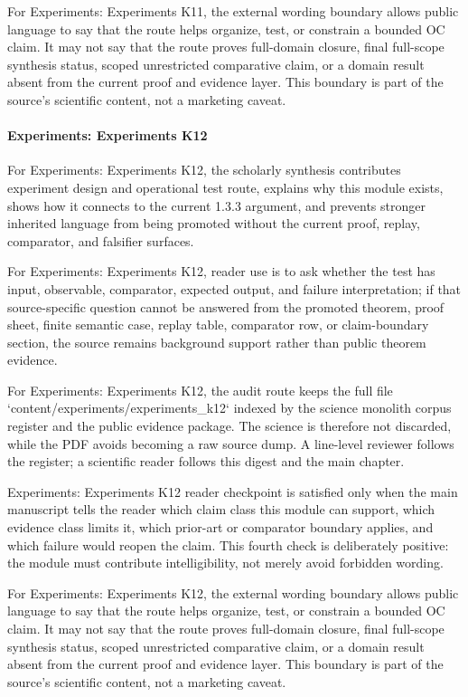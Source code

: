 For Experiments: Experiments K11, the external wording boundary allows public language to say that the route helps organize, test, or constrain a bounded OC claim. It may not say that the route proves full-domain closure, final full-scope synthesis status, scoped unrestricted comparative claim, or a domain result absent from the current proof and evidence layer. This boundary is part of the source's scientific content, not a marketing caveat.


\paragraph{Experiments: Experiments K12}

For Experiments: Experiments K12, the scholarly synthesis contributes experiment design and operational test route, explains why this module exists, shows how it connects to the current 1.3.3 argument, and prevents stronger inherited language from being promoted without the current proof, replay, comparator, and falsifier surfaces.


For Experiments: Experiments K12, reader use is to ask whether the test has input, observable, comparator, expected output, and failure interpretation; if that source-specific question cannot be answered from the promoted theorem, proof sheet, finite semantic case, replay table, comparator row, or claim-boundary section, the source remains background support rather than public theorem evidence.


For Experiments: Experiments K12, the audit route keeps the full file `content/experiments/experiments\_k12` indexed by the science monolith corpus register and the public evidence package. The science is therefore not discarded, while the PDF avoids becoming a raw source dump. A line-level reviewer follows the register; a scientific reader follows this digest and the main chapter.


Experiments: Experiments K12 reader checkpoint is satisfied only when the main manuscript tells the reader which claim class this module can support, which evidence class limits it, which prior-art or comparator boundary applies, and which failure would reopen the claim. This fourth check is deliberately positive: the module must contribute intelligibility, not merely avoid forbidden wording.


For Experiments: Experiments K12, the external wording boundary allows public language to say that the route helps organize, test, or constrain a bounded OC claim. It may not say that the route proves full-domain closure, final full-scope synthesis status, scoped unrestricted comparative claim, or a domain result absent from the current proof and evidence layer. This boundary is part of the source's scientific content, not a marketing caveat.


